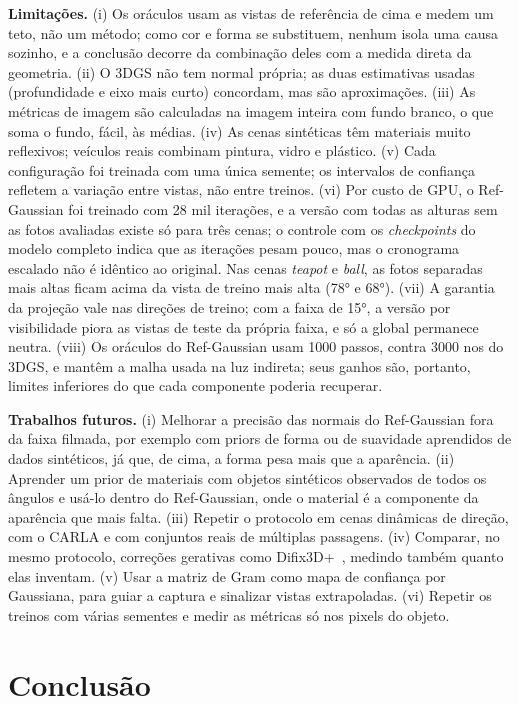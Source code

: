 \textbf{Limitações.} (i) Os oráculos usam as vistas de referência de cima e medem um teto, não um método; como cor e forma se substituem, nenhum isola uma causa sozinho, e a conclusão decorre da combinação deles com a medida direta da geometria. (ii) O 3DGS não tem normal própria; as duas estimativas usadas (profundidade e eixo mais curto) concordam, mas são aproximações. (iii) As métricas de imagem são calculadas na imagem inteira com fundo branco, o que soma o fundo, fácil, às médias. (iv) As cenas sintéticas têm materiais muito reflexivos; veículos reais combinam pintura, vidro e plástico. (v) Cada configuração foi treinada com uma única semente; os intervalos de confiança refletem a variação entre vistas, não entre treinos. (vi) Por custo de GPU, o Ref-Gaussian foi treinado com 28 mil iterações, e a versão com todas as alturas sem as fotos avaliadas existe só para três cenas; o controle com os \textit{checkpoints} do modelo completo indica que as iterações pesam pouco, mas o cronograma escalado não é idêntico ao original. Nas cenas \textit{teapot} e \textit{ball}, as fotos separadas mais altas ficam acima da vista de treino mais alta (78° e 68°). (vii) A garantia da projeção vale nas direções de treino; com a faixa de 15°, a versão por visibilidade piora as vistas de teste da própria faixa, e só a global permanece neutra. (viii) Os oráculos do Ref-Gaussian usam 1000 passos, contra 3000 nos do 3DGS, e mantêm a malha usada na luz indireta; seus ganhos são, portanto, limites inferiores do que cada componente poderia recuperar.

\textbf{Trabalhos futuros.} (i) Melhorar a precisão das normais do Ref-Gaussian fora da faixa filmada, por exemplo com priors de forma ou de suavidade aprendidos de dados sintéticos, já que, de cima, a forma pesa mais que a aparência. (ii) Aprender um prior de materiais com objetos sintéticos observados de todos os ângulos e usá-lo dentro do Ref-Gaussian, onde o material é a componente da aparência que mais falta. (iii) Repetir o protocolo em cenas dinâmicas de direção, com o CARLA e com conjuntos reais de múltiplas passagens. (iv) Comparar, no mesmo protocolo, correções gerativas como Difix3D+~\cite{wu2025difix3d}, medindo também quanto elas inventam. (v) Usar a matriz de Gram como mapa de confiança por Gaussiana, para guiar a captura e sinalizar vistas extrapoladas. (vi) Repetir os treinos com várias sementes e medir as métricas só nos pixels do objeto.

\section{Conclusão}\label{sec:conclusao}

